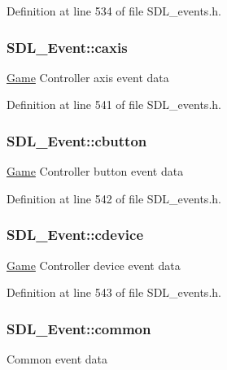 Definition at line 534 of file S\-D\-L\-\_\-events.\-h.

\hypertarget{union_s_d_l___event_aa8f6df0f2716fae56204b12ab4a4c289}{
\subsubsection[{caxis}]{ S\-D\-L\-\_\-\-Event\-::caxis}}\label{union_s_d_l___event_aa8f6df0f2716fae56204b12ab4a4c289}
\hyperlink{class_game}{Game} Controller axis event data 

Definition at line 541 of file S\-D\-L\-\_\-events.\-h.

\hypertarget{union_s_d_l___event_aee2b5671c8dcdb447023715cc21593cb}{
\subsubsection[{cbutton}]{ S\-D\-L\-\_\-\-Event\-::cbutton}}\label{union_s_d_l___event_aee2b5671c8dcdb447023715cc21593cb}
\hyperlink{class_game}{Game} Controller button event data 

Definition at line 542 of file S\-D\-L\-\_\-events.\-h.

\hypertarget{union_s_d_l___event_ad3beed01e690b885728e0b0e1d636378}{
\subsubsection[{cdevice}]{ S\-D\-L\-\_\-\-Event\-::cdevice}}\label{union_s_d_l___event_ad3beed01e690b885728e0b0e1d636378}
\hyperlink{class_game}{Game} Controller device event data 

Definition at line 543 of file S\-D\-L\-\_\-events.\-h.

\hypertarget{union_s_d_l___event_abe5cb8767f93de55163c8ddd4562a7f2}{
\subsubsection[{common}]{ S\-D\-L\-\_\-\-Event\-::common}}\label{union_s_d_l___event_abe5cb8767f93de55163c8ddd4562a7f2}
Common event data 


